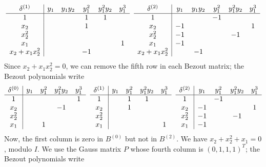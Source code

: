 \documentclass{standalone}
\begin{document}
$$
\begin{array}{c|ccccc}
	\delta^{(1)}  & y_1 & y_1y_2 & y_1^2 & y_1^2y_2 & y_1^3 \\
	\hline
	1  &  &  & 1 & 1 & \\
	x_2  &  &  & 1 &  & \\
	x_2^2  &  &  &  &  & \\
	x_1  &  &  &  &  & 1 \\
	x_2 + x_1x_2^2  &  &  & -1 &  &
\end{array}
\hspace{0.2cm}
\begin{array}{c|ccccc}
	\delta^{(2)} & y_1 & y_1y_2 & y_1^2 & y_1^2y_2 & y_1^3 \\
	\hline
	1  &  &  & -1 &  & \\
	x_2  & -1 &  &  &  & 1 \\
	x_2^2  & -1 &  &  & -1 & \\
	x_1  & -1 &  &  &  & \\
	x_2 + x_1x_2^2 &  & -1 &  &  &
\end{array}
$$
Since $x_2 + x_1x_2^{2} = 0$, we can remove the fifth row in each Bezout matrix; the Bezout polynomials write
$$
\begin{array}{c|cccc}
	\delta^{(0)} & y_1 & y_1^2 & y_1^2y_2 & y_1^3 \\
	\hline
	1  &   &  &  & 1 \\
	x_2  &  &  & -1 & \\
	x_2^2  &  &  &  & \\
	x_1  &  & 1 &  &
\end{array}
\hspace{0.2cm}
\begin{array}{c|cccc}
	\delta^{(1)}  & y_1 & y_1^2 & y_1^2y_2 & y_1^3 \\
	\hline
	1  &  & 1 & 1 & \\
	x_2  &  & 1 &  & \\
	x_2^2  &  &  &  & \\
	x_1  &  &  &  & 1
\end{array}
\hspace{0.2cm}
\begin{array}{c|cccc}
	\delta^{(2)} & y_1 & y_1^2 & y_1^2y_2 & y_1^3 \\
	\hline
	1  &  & -1 &  & \\
	x_2  & -1 &  &  & 1 \\
	x_2^2  & -1 &  & -1 & \\
	x_1  & -1 &  &  &
\end{array}
$$
Now, the first column is zero in $B^{(0)}$ but not in $B^{(2)}$. We have $x_2 + x_2^{2} + x_1 = 0$, modulo $I$. We use the Gauss matrix $P$ whose fourth column is $(0, 1, 1, 1)^{T}$; the Bezout polynomials write
\end{document}
